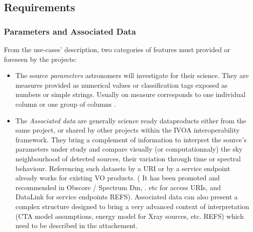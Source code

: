 \documentclass[11pt,a4paper]{ivoa}
\begin{document}
\subsection{Requirements}

\subsubsection{Parameters and Associated Data}
From the use-cases' description, two categories of features must provided or foreseen by the projects:

  \begin{itemize}
    \item The source \emph{parameters} astronomers will investigate for their science. They are measures provided as numerical values or classification tags exposed as numbers or simple strings. Usually on measure corresponds to one individual column or one group of columns .
     \item The \emph{Associated data} are generally science ready dataproducts either from the same project, or shared by other projects within the IVOA interoperability framework.
They bring a complement of information to interpret the source's  parameters under study and compare visually (or computationnaly) the sky neighbourhood of detected sources, their variation through time or spectral behaviour.
Referencing such datasets by a URI or by a service endpoint already works for existing VO products. ( It has been promoted and recommended in Obscore / Spectrum Dm, . etc for access URIs, and DataLink for service endpoints REFS).
Associated data can also present a complex structure designed to bring a very advanced context of interpretation (CTA model assumptions, energy model for Xray sources, etc. REFS) which need to be described in the attachement.
 \end{itemize}     
\end{document}
